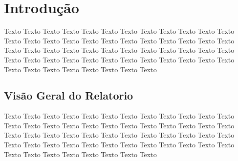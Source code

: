 \chapter{Introdução}

  Texto Texto Texto Texto Texto Texto Texto Texto Texto Texto Texto Texto Texto Texto
  Texto Texto Texto Texto Texto Texto Texto Texto Texto Texto Texto Texto Texto Texto
  Texto Texto Texto Texto Texto Texto Texto Texto Texto Texto Texto Texto Texto Texto
  Texto Texto Texto Texto Texto Texto Texto Texto Texto Texto Texto Texto Texto Texto

\section{Visão Geral do Relatorio}

  Texto Texto Texto Texto Texto Texto Texto Texto Texto Texto Texto Texto Texto Texto
  Texto Texto Texto Texto Texto Texto Texto Texto Texto Texto Texto Texto Texto Texto
  Texto Texto Texto Texto Texto Texto Texto Texto Texto Texto Texto Texto Texto Texto
  Texto Texto Texto Texto Texto Texto Texto Texto Texto Texto Texto Texto Texto Texto

